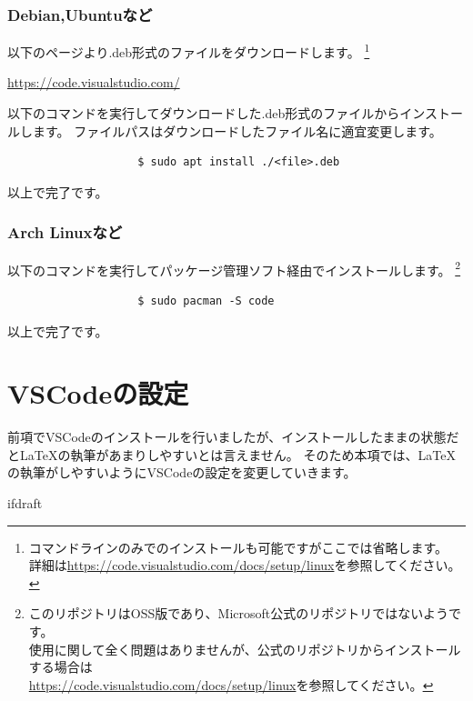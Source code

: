 			\subsubsection{Debian,Ubuntuなど}
				以下のページより.deb形式のファイルをダウンロードします。
				\footnote{コマンドラインのみでのインストールも可能ですがここでは省略します。
						\\詳細は\url{https://code.visualstudio.com/docs/setup/linux}を参照してください。}
				\begin{mdframed}[style=shadow]
					\url{https://code.visualstudio.com/}
				\end{mdframed}
				以下のコマンドを実行してダウンロードした.deb形式のファイルからインストールします。
				ファイルパスはダウンロードしたファイル名に適宜変更します。
				\begin{mdframed}[style=bash]
					\begin{verbatim}
					$ sudo apt install ./<file>.deb
					\end{verbatim}
				\end{mdframed}
				以上で完了です。

			\subsubsection{Arch Linuxなど}
				以下のコマンドを実行してパッケージ管理ソフト経由でインストールします。
				\footnote{このリポジトリはOSS版であり、Microsoft公式のリポジトリではないようです。
						\\使用に関して全く問題はありませんが、公式のリポジトリからインストールする場合は
						\\\url{https://code.visualstudio.com/docs/setup/linux}を参照してください。}
				\begin{mdframed}[style=bash]
					\begin{verbatim}
					$ sudo pacman -S code
					\end{verbatim}
				\end{mdframed}
				以上で完了です。

	\section{VSCodeの設定}
		前項でVSCodeのインストールを行いましたが、インストールしたままの状態だと\LaTeX の執筆があまりしやすいとは言えません。
		そのため本項では、\LaTeX の執筆がしやすいようにVSCodeの設定を変更していきます。

\expandafter\ifx\csname ifdraft\endcsname\relax

\fi